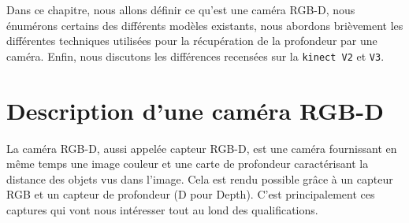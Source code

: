 \documentclass[a4paper, 12pt]{book}
\begin{document}
Dans ce chapitre, nous allons définir ce qu'est une caméra RGB-D, nous énumérons certains des différents modèles existants, nous abordons brièvement les différentes techniques utilisées pour la récupération de la profondeur par une caméra. Enfin, nous discutons les différences recensées sur la \texttt{kinect V2} et \texttt{V3}.

\section{Description d'une caméra RGB-D}

La caméra RGB-D, aussi appelée capteur RGB-D, est une caméra fournissant en même temps une image couleur et une carte de profondeur caractérisant la distance des objets vus dans l'image. Cela est rendu possible grâce à un capteur RGB et un capteur de profondeur (D pour Depth). C'est principalement ces captures qui vont nous intéresser tout au lond des qualifications.
\end{document}
